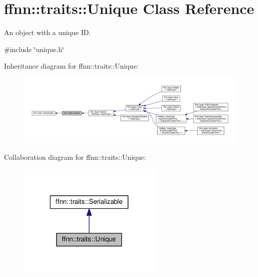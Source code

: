 \hypertarget{classffnn_1_1traits_1_1_unique}{\section{ffnn\-:\-:traits\-:\-:Unique Class Reference}
\label{classffnn_1_1traits_1_1_unique}
}


An object with a unique I\-D.  




{\ttfamily \#include \char`\"{}unique.\-h\char`\"{}}



Inheritance diagram for ffnn\-:\-:traits\-:\-:Unique\-:
\nopagebreak
\begin{figure}[H]
\begin{center}
\leavevmode
\includegraphics[width=350pt]{classffnn_1_1traits_1_1_unique__inherit__graph}
\end{center}
\end{figure}


Collaboration diagram for ffnn\-:\-:traits\-:\-:Unique\-:
\nopagebreak
\begin{figure}[H]
\begin{center}
\leavevmode
\includegraphics[width=196pt]{classffnn_1_1traits_1_1_unique__coll__graph}
\end{center}
\end{figure}
